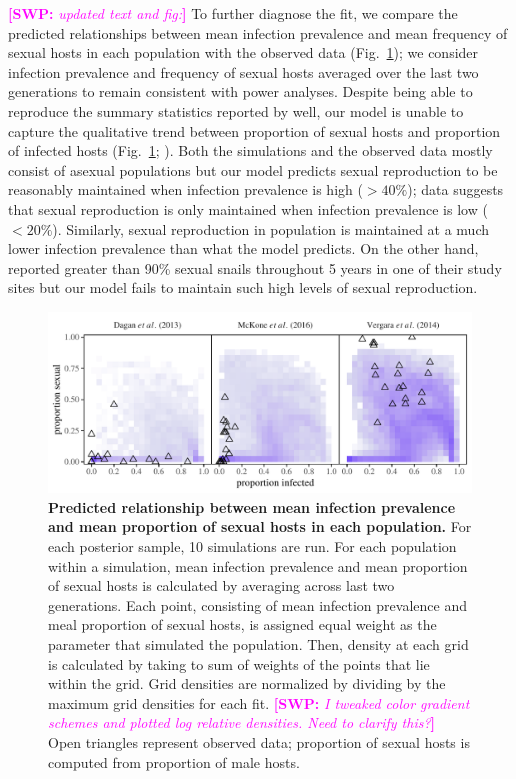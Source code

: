 \documentclass{article}\usepackage[]{graphicx}\usepackage[]{color}
\newcommand{\comment}[3]{\textcolor{#1}{\textbf{[#2: }\textit{#3}\textbf{]}}}
\newcommand{\swp}[1]{\comment{magenta}{SWP}{#1}}
\newcommand{\fref}[1]{Fig.~\ref{fig:#1}}
\begin{document}
\swp{updated text and fig:}
To further diagnose the fit, we compare the predicted relationships between mean infection prevalence and mean frequency of sexual hosts in each population with the observed data (\fref{ivs});
we consider infection prevalence and frequency of sexual hosts averaged over the last two generations to remain consistent with power analyses.
Despite being able to reproduce the summary statistics reported by \cite{dagan2013clonal} well, 
our model is unable to capture the qualitative trend between proportion of sexual hosts and proportion of infected hosts (\fref{ivs}; \cite{dagan2013clonal}).
Both the simulations and the observed data mostly consist of asexual populations
but our model predicts sexual reproduction to be reasonably maintained when infection prevalence is high ($> 40\%$); \cite{dagan2013clonal} data suggests that sexual reproduction is only maintained when infection prevalence is low ($< 20\%$).
Similarly, sexual reproduction in \cite{mckone2016fine} population is maintained at a much lower infection prevalence than what the model predicts.
On the other hand, \cite{vergara2014infection} reported greater than 90\% sexual snails throughout 5 years in one of their study sites but our model fails to maintain such high levels of sexual reproduction.

\begin{figure}[!ht]
\includegraphics[width=\textwidth]{../fig/simulated_data2.pdf}
\caption{{\bf Predicted relationship between mean infection prevalence and mean proportion of sexual hosts in each population.}
For each posterior sample, 10 simulations are run.
For each population within a simulation, mean infection prevalence and mean proportion of sexual hosts is calculated by averaging across last two generations. 
Each point, consisting of mean infection prevalence and meal proportion of sexual hosts, is assigned equal weight as the parameter that simulated the population.
Then, density at each grid is calculated by taking to sum of weights of the points that lie within the grid.
Grid densities are normalized by dividing by the maximum grid densities for each fit.
\swp{I tweaked color gradient schemes and plotted log relative densities. Need to clarify this?}
Open triangles represent observed data; proportion of sexual hosts is computed from proportion of male hosts.
}
\label{fig:ivs}
\end{figure}
\end{document}
